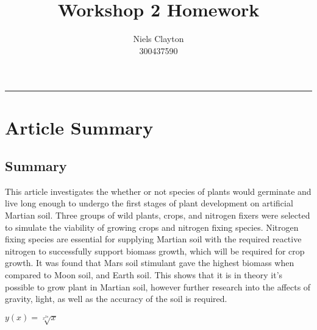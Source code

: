 \documentclass[a4paper,11pt]{article}
\begin{document}
\title{\LARGE{\textbf{Workshop 2 Homework}}}
\author{Niels Clayton \\300437590}
\maketitle
\hrule

\section{\LARGE{Article Summary}}
\subsection{Summary}
\linenumbers
This article investigates the whether or not species of plants would germinate and live long enough to undergo the first stages of plant development on artificial Martian soil. Three groups of wild plants, crops, and nitrogen fixers were selected to simulate  the viability of growing crops and nitrogen fixing species. Nitrogen fixing species are essential for supplying Martian soil with the required reactive nitrogen to successfully support biomass growth, which will be required for crop growth. It was found that Mars soil stimulant gave the highest biomass when compared to Moon soil, and Earth soil. This shows that it is in theory it's possible to grow plant in Martian  soil, however further research into the affects of gravity, light, as well as the accuracy of the soil is required.

$y(x)=\sqrt[x^{2\pi}]{x}$
\end{document}
